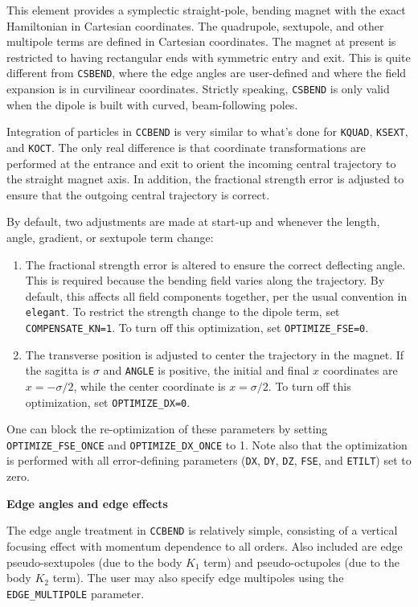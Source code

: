 This element provides a symplectic straight-pole, bending magnet with the exact
Hamiltonian in Cartesian coordinates.  
The quadrupole, sextupole, and other multipole terms are defined in Cartesian coordinates.
The magnet at present is restricted to having rectangular ends with symmetric entry and
exit.
This is quite different from \verb|CSBEND|, where the edge angles are user-defined and
where the field expansion is in curvilinear coordinates.
Strictly speaking, \verb|CSBEND| is only valid when the dipole is built with curved,
beam-following poles.

Integration of particles in \verb|CCBEND| is very similar to what's done for
\verb|KQUAD|, \verb|KSEXT|, and \verb|KOCT|. 
The only real difference is that coordinate transformations are performed at the
entrance and exit to orient the incoming central trajectory to the straight magnet axis.
In addition, the fractional strength error is adjusted to ensure that the 
outgoing central trajectory is correct.

By default, two adjustments are made at start-up and whenever the length, angle, 
gradient, or sextupole term change:
\begin{enumerate}
\item The fractional strength error is altered to ensure the correct deflecting angle. 
      This is required because the bending field varies along the trajectory.
      By default, this affects all field 
      components together, per the usual convention in {\tt elegant}. To restrict
      the strength change to the dipole term, set \verb|COMPENSATE_KN=1|.
      To turn off this optimization, set \verb|OPTIMIZE_FSE=0|.
\item The transverse position is adjusted to center the trajectory in the magnet.
      If the sagitta is $\sigma$ and \verb|ANGLE| is positive, the initial and final $x$ 
      coordinates are $x=-\sigma/2$, while the center coordinate is $x=\sigma/2$.
      To turn off this optimization, set \verb|OPTIMIZE_DX=0|.
\end{enumerate}
One can block the re-optimization of these parameters by setting 
\verb|OPTIMIZE_FSE_ONCE| and \verb|OPTIMIZE_DX_ONCE| to 1.
Note also that the optimization is performed with all error-defining parameters
(\verb|DX|, \verb|DY|, \verb|DZ|, \verb|FSE|, and \verb|ETILT|) set to zero.

{\bf Edge angles and edge effects} 

The edge angle treatment in \verb|CCBEND| is relatively simple, consisting of a 
vertical focusing effect with momentum dependence to all orders.
Also included are edge pseudo-sextupoles (due to the body $K_1$ term) and
pseudo-octupoles (due to the body $K_2$ term).
The user may also specify edge multipoles using the \verb|EDGE_MULTIPOLE| parameter.

